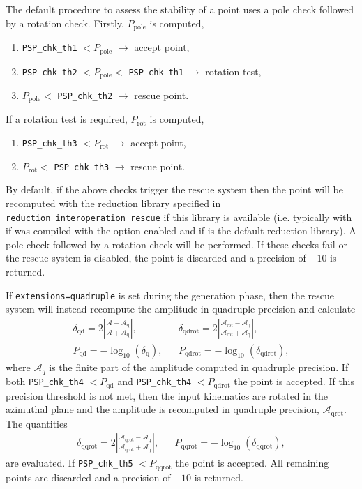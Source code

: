 The default procedure to assess the stability of a point uses a pole check followed by a rotation check.
Firstly, $P_\mathrm{pole}$ is computed,
\begin{enumerate}
\item \texttt{PSP\_chk\_th1} $< P_\mathrm{pole}$ $\rightarrow$ accept point,
\item \texttt{PSP\_chk\_th2} $< P_\mathrm{pole} < $ \texttt{PSP\_chk\_th1} $\rightarrow$ rotation test,
\item $P_\mathrm{pole} <$ \texttt{PSP\_chk\_th2} $\rightarrow$ rescue point.
\end{enumerate}
If a rotation test is required, $P_\mathrm{rot}$ is computed,
\begin{enumerate}
\item \texttt{PSP\_chk\_th3} $< P_\mathrm{rot}$ $\rightarrow$ accept point,
\item  $P_\mathrm{rot} <$ \texttt{PSP\_chk\_th3} $\rightarrow$ rescue point.
\end{enumerate}

By default, if the above checks trigger the rescue system then the
point will be recomputed with the reduction library specified in
\texttt{reduction\_interoperation\_rescue} if this
library is available (i.e. typically with \golem  if \gosam was compiled with the \golem
option enabled and if \ninja is the default reduction library).
A pole check followed by a rotation check will be performed.
If these checks fail or the rescue system is disabled, the point is discarded and a precision of $-10$ is returned.

If \texttt{extensions=quadruple} is set during the \gosam generation phase, then the rescue system will instead recompute the amplitude in quadruple precision and calculate
\begin{align}
&\delta_\mathrm{qd} = 2 \left| \frac{\mathcal{A}-\mathcal{A}_\mathrm{q}}{\mathcal{A}+\mathcal{A}_\mathrm{q}} \right|,&
&\delta_\mathrm{qdrot} = 2 \left| \frac{\mathcal{A}_\mathrm{rot}-\mathcal{A}_\mathrm{q}}{\mathcal{A}_\mathrm{rot}+\mathcal{A}_\mathrm{q}} \right|, & \\
&P_\mathrm{qd} = -\log_\mathrm{10}(\delta_\mathrm{q}),&
&P_\mathrm{qdrot} = -\log_\mathrm{10}(\delta_\mathrm{qdrot}),&
\end{align}
where $\mathcal{A}_q$ is the finite part of the amplitude computed in quadruple precision.
If both \texttt{PSP\_chk\_th4} $< P_\mathrm{qd}$ and \texttt{PSP\_chk\_th4} $< P_\mathrm{qdrot}$ the point is accepted.
If this precision threshold is not met, then the input kinematics are rotated in the azimuthal plane and the amplitude is recomputed in quadruple precision, $\mathcal{A}_\mathrm{qrot}$.
The quantities
\begin{align}
&\delta_\mathrm{qqrot} = 2 \left| \frac{\mathcal{A}_\mathrm{qrot}-\mathcal{A}_\mathrm{q}}{\mathcal{A}_\mathrm{qrot}+\mathcal{A}_\mathrm{q}} \right|,&
&P_\mathrm{qqrot} = -\log_\mathrm{10}(\delta_\mathrm{qqrot}),&
\end{align}
are evaluated.
If \texttt{PSP\_chk\_th5} $< P_\mathrm{qqrot}$ the point is accepted. 
All remaining points are discarded and a precision of $-10$ is returned.

